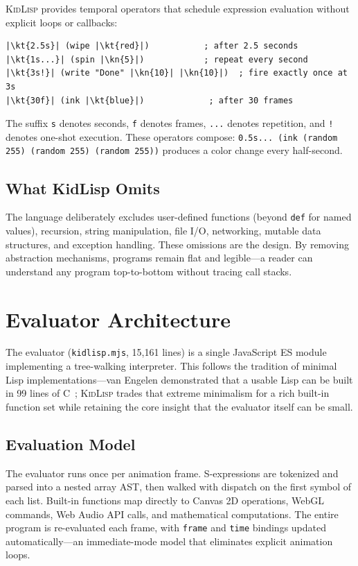 \documentclass[10pt,letterpaper,twocolumn]{article}
\newcommand{\kn}[1]{\textcolor{klnum}{#1}}
\newcommand{\kt}[1]{\textcolor{klstr}{#1}}
\newcommand{\kidlisp}{\textsc{KidLisp}}
\begin{document}
\kidlisp{} provides temporal operators that schedule expression evaluation without explicit loops or callbacks:

\begin{lstlisting}
|\kt{2.5s}| (wipe |\kt{red}|)           ; after 2.5 seconds
|\kt{1s...}| (spin |\kn{5}|)            ; repeat every second
|\kt{3s!}| (write "Done" |\kn{10}| |\kn{10}|)  ; fire exactly once at 3s
|\kt{30f}| (ink |\kt{blue}|)             ; after 30 frames
\end{lstlisting}

The suffix \texttt{s} denotes seconds, \texttt{f} denotes frames, \texttt{...} denotes repetition, and \texttt{!} denotes one-shot execution. These operators compose: \texttt{0.5s... (ink (random 255) (random 255) (random 255))} produces a color change every half-second.

\subsection{What KidLisp Omits}

The language deliberately excludes user-defined functions (beyond \texttt{def} for named values), recursion, string manipulation, file I/O, networking, mutable data structures, and exception handling. These omissions are the design. By removing abstraction mechanisms, programs remain flat and legible---a reader can understand any program top-to-bottom without tracing call stacks.


\section{Evaluator Architecture}
\label{sec:architecture}

The evaluator (\texttt{kidlisp.mjs}, 15,161 lines) is a single JavaScript ES module implementing a tree-walking interpreter. This follows the tradition of minimal Lisp implementations---van Engelen demonstrated that a usable Lisp can be built in 99 lines of C~\citep{vanengelen2022tinylisp}; \kidlisp{} trades that extreme minimalism for a rich built-in function set while retaining the core insight that the evaluator itself can be small.

\subsection{Evaluation Model}

The evaluator runs once per animation frame. S-expressions are tokenized and parsed into a nested array AST, then walked with dispatch on the first symbol of each list. Built-in functions map directly to Canvas 2D operations, WebGL commands, Web Audio API calls, and mathematical computations. The entire program is re-evaluated each frame, with \texttt{frame} and \texttt{time} bindings updated automatically---an immediate-mode model that eliminates explicit animation loops.
\end{document}
